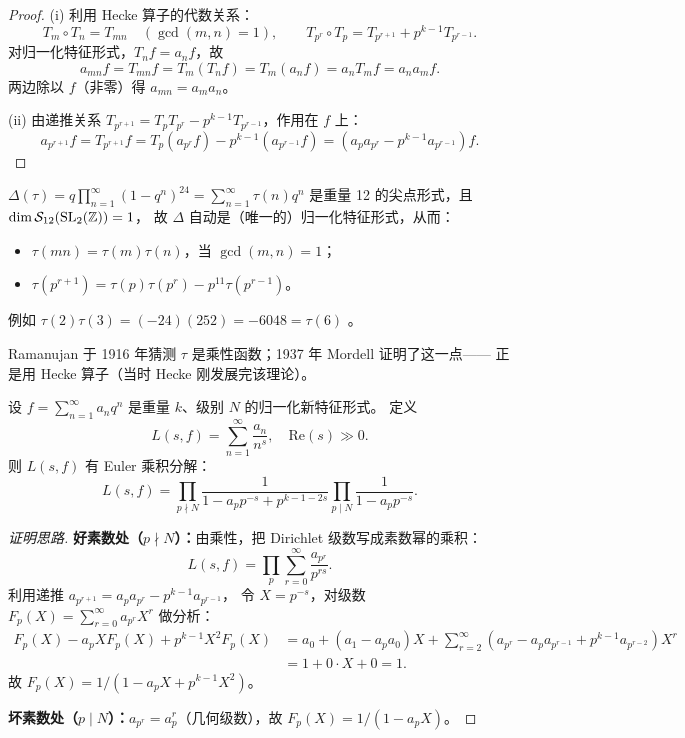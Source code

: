 \begin{proof}
(i) 利用 Hecke 算子的代数关系：
\[
  T_m \circ T_n = T_{mn} \quad (\gcd(m,n)=1), \qquad
  T_{p^r} \circ T_p = T_{p^{r+1}} + p^{k-1} T_{p^{r-1}}.
\]
对归一化特征形式，$T_n f = a_n f$，故
\[
  a_{mn} f = T_{mn} f = T_m(T_n f) = T_m(a_n f) = a_n T_m f = a_n a_m f.
\]
两边除以 $f$（非零）得 $a_{mn} = a_m a_n$。

(ii) 由递推关系 $T_{p^{r+1}} = T_p T_{p^r} - p^{k-1} T_{p^{r-1}}$，作用在 $f$ 上：
\[
  a_{p^{r+1}} f = T_{p^{r+1}} f
  = T_p(a_{p^r} f) - p^{k-1}(a_{p^{r-1}} f)
  = (a_p a_{p^r} - p^{k-1} a_{p^{r-1}}) f.
\]
\end{proof}

\begin{example}
\label{ex:tau-multiplicativity}
$\Delta(\tau) = q\prod_{n=1}^\infty(1-q^n)^{24} = \sum_{n=1}^\infty \tau(n)q^n$
是重量 12 的尖点形式，且 $\dim \mathcal{S}_{12}(\mathrm{SL}_2(\mathbb{Z})) = 1$，
故 $\Delta$ 自动是（唯一的）归一化特征形式，从而：
\begin{itemize}
  \item $\tau(mn) = \tau(m)\tau(n)$，当 $\gcd(m,n)=1$；
  \item $\tau(p^{r+1}) = \tau(p)\tau(p^r) - p^{11}\tau(p^{r-1})$。
\end{itemize}
例如 $\tau(2)\tau(3) = (-24)(252) = -6048 = \tau(6)$ \checkmark。

Ramanujan 于 1916 年猜测 $\tau$ 是乘性函数；1937 年 Mordell 证明了这一点——
正是用 Hecke 算子（当时 Hecke 刚发展完该理论）。
\end{example}

\begin{theorem}
\label{thm:L-function-euler-product}
设 $f = \sum_{n=1}^\infty a_n q^n$ 是重量 $k$、级别 $N$ 的归一化新特征形式。
定义
\[
  L(s, f) = \sum_{n=1}^{\infty} \frac{a_n}{n^s}, \quad \mathrm{Re}(s) \gg 0.
\]
则 $L(s,f)$ 有 Euler 乘积分解：
\[
  L(s, f)
  = \prod_{p \nmid N} \frac{1}{1 - a_p p^{-s} + p^{k-1-2s}}
    \prod_{p \mid N} \frac{1}{1 - a_p p^{-s}}.
\]
\end{theorem}



\begin{proof}[证明思路]
\textbf{好素数处（$p \nmid N$）：}由乘性，把 Dirichlet 级数写成素数幂的乘积：
\[
  L(s,f) = \prod_p \sum_{r=0}^\infty \frac{a_{p^r}}{p^{rs}}.
\]
利用递推 $a_{p^{r+1}} = a_p a_{p^r} - p^{k-1}a_{p^{r-1}}$，
令 $X = p^{-s}$，对级数 $F_p(X) = \sum_{r=0}^\infty a_{p^r} X^r$ 做分析：
\begin{align}
  F_p(X) - a_p X F_p(X) + p^{k-1} X^2 F_p(X)
  &= a_0 + (a_1 - a_p a_0) X + \sum_{r=2}^\infty (a_{p^r} - a_p a_{p^{r-1}} + p^{k-1}a_{p^{r-2}}) X^r \\
  &= 1 + 0 \cdot X + 0 = 1.
\end{align}
故 $F_p(X) = 1/(1 - a_p X + p^{k-1} X^2)$。

\textbf{坏素数处（$p \mid N$）：}$a_{p^r} = a_p^r$（几何级数），故
$F_p(X) = 1/(1 - a_p X)$。
\end{proof}

